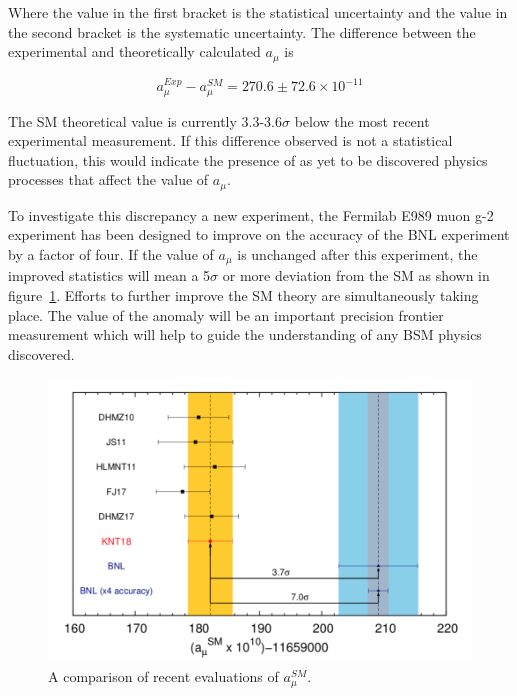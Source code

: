 Where the value in the first bracket is the statistical uncertainty and the value in the second bracket is the systematic uncertainty. The difference between the experimental and theoretically calculated $a_{\mu}$ is

\begin{equation}
a_{\mu}^{Exp} - a_{\mu}^{SM} = 270.6{\pm}72.6{\times}10^{-11}
\end{equation}

The SM theoretical value is currently 3.3-3.6$\sigma$ \cite{Reference29} below the most recent experimental measurement. If this difference observed is not a statistical fluctuation, this would indicate the presence of as yet to be discovered physics processes that affect the value of $a_{\mu}$.

To investigate this discrepancy a new experiment, the Fermilab E989 muon g-2 experiment has been designed to improve on the accuracy of the BNL experiment by a factor of four. If the value of $a_{\mu}$ is unchanged after this experiment, the improved statistics will mean a 5$\sigma$ or more deviation from the SM as shown in figure~\ref{fig:SManomalousMagMom}. Efforts to further improve the SM theory are simultaneously taking place. 
The value of the anomaly will be an important precision frontier measurement which will help to guide the understanding of any BSM physics discovered.

\begin{figure}[th]
\centering
\includegraphics[scale=0.7]{Figures/SManomalousMagMom}
\decoRule
\caption{A comparison of recent evaluations of $a_{\mu}^{SM}$.}
\label{fig:SManomalousMagMom}
\end{figure}

